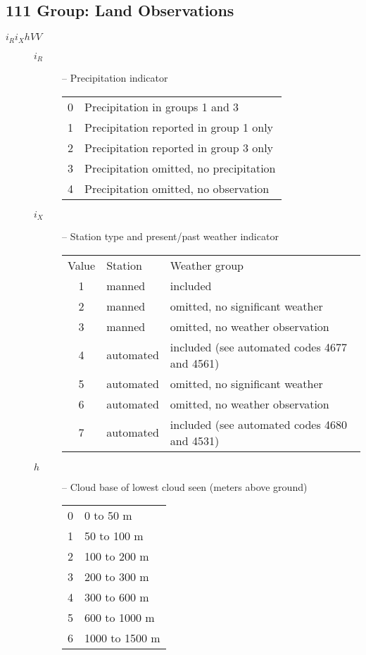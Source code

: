 \documentclass{article}
\begin{document}
\subsection{111 Group: Land Observations}

\begin{description}
\item[$i_Ri_XhVV$]
  \begin{description}
  \item[$i_R$] -- Precipitation indicator
    \begin{tabular}{cl}
      0 & Precipitation in groups 1 and 3\\
      1 & Precipitation reported in group 1 only\\
      2 & Precipitation reported in group 3 only\\
      3 & Precipitation omitted, no precipitation\\
      4 & Precipitation omitted, no observation
    \end{tabular}
  \item[$i_X$] -- Station type and present/past weather indicator
    \begin{tabular}{cll}
      Value & Station & Weather group\\
      1 & manned  &included\\
      2 & manned  &omitted, no significant weather\\
      3 & manned  &omitted, no weather observation\\
      4 & automated  & included (see automated codes 4677 and 4561)\\
      5 & automated  & omitted, no significant weather\\
      6 & automated  & omitted, no weather observation\\
      7 & automated  & included (see automated codes 4680 and 4531)\\
    \end{tabular}
  \item[$h$] -- Cloud base of lowest cloud seen (meters above ground)
    \begin{tabular}{cl}
      0 & 0 to 50 m \\
      1 & 50 to 100 m \\
      2 & 100 to 200 m\\
      3 & 200 to 300 m\\
      4 & 300 to 600 m\\
      5 & 600 to 1000 m\\
      6 & 1000 to 1500 m\\

\end{tabular}
\end{description}
\end{description}
\end{document}
